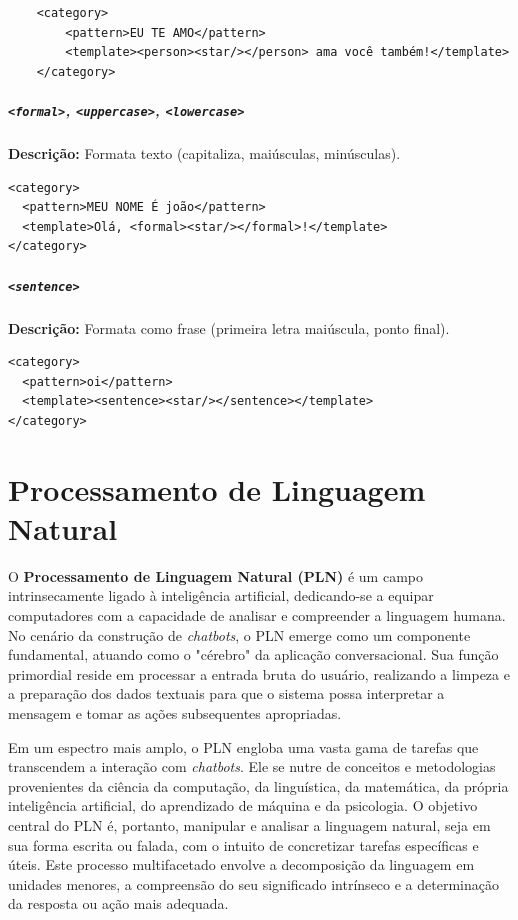 \documentclass[14pt,a4paper,oneside]{book}
\begin{document}
\begin{verbatim}
	<category>
		<pattern>EU TE AMO</pattern>
		<template><person><star/></person> ama você também!</template>
	</category>
\end{verbatim}

\paragraph{\texttt{<formal>}, \texttt{<uppercase>}, \texttt{<lowercase>}} 

\textbf{Descrição:} Formata texto (capitaliza, maiúsculas, minúsculas). 

\begin{verbatim}
<category>
  <pattern>MEU NOME É joão</pattern>
  <template>Olá, <formal><star/></formal>!</template>
</category>
\end{verbatim}

\paragraph{\texttt{<sentence>}} 

\textbf{Descrição:} Formata como frase (primeira letra maiúscula, ponto final). 

\begin{verbatim}
<category>
  <pattern>oi</pattern>
  <template><sentence><star/></sentence></template>
</category>
\end{verbatim}



\chapter{Processamento de Linguagem Natural}

O \textbf{Processamento de Linguagem Natural (PLN)} é um campo intrinsecamente ligado à inteligência artificial, dedicando-se a equipar computadores com a capacidade de analisar e compreender a linguagem humana. No cenário da construção de \textit{chatbots}, o PLN emerge como um componente fundamental, atuando como o "cérebro" da aplicação conversacional. Sua função primordial reside em processar a entrada bruta do usuário, realizando a limpeza e a preparação dos dados textuais para que o sistema possa interpretar a mensagem e tomar as ações subsequentes apropriadas.

Em um espectro mais amplo, o PLN engloba uma vasta gama de tarefas que transcendem a interação com \textit{chatbots}. Ele se nutre de conceitos e metodologias provenientes da ciência da computação, da linguística, da matemática, da própria inteligência artificial, do aprendizado de máquina e da psicologia. O objetivo central do PLN é, portanto, manipular e analisar a linguagem natural, seja em sua forma escrita ou falada, com o intuito de concretizar tarefas específicas e úteis. Este processo multifacetado envolve a decomposição da linguagem em unidades menores, a compreensão do seu significado intrínseco e a determinação da resposta ou ação mais adequada.
\end{document}
